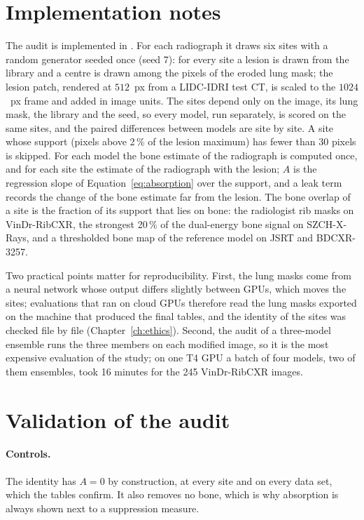 

\section{Implementation notes}
The audit is implemented in . For each radiograph it draws six sites with a random generator seeded once (seed 7):
for every site a lesion is drawn from the library and a centre is drawn among the pixels of the eroded lung mask; the lesion patch, rendered
at $512$~px from a LIDC-IDRI test CT, is scaled to the $1024$~px frame and added in image units. The sites depend only on the image, its lung
mask, the library and the seed, so every model, run separately, is scored on the same sites, and the paired differences between models are
site by site. A site whose support (pixels above 2\,\% of the lesion maximum) has fewer than 30 pixels is skipped. For each model the bone
estimate of the radiograph is computed once, and for each site the estimate of the radiograph with the lesion; $A$ is the regression slope of
Equation~\ref{eq:absorption} over the support, and a leak term records the change of the bone estimate far from the lesion. The bone overlap of
a site is the fraction of its support that lies on bone: the radiologist rib masks on VinDr-RibCXR, the strongest 20\,\% of the dual-energy
bone signal on SZCH-X-Rays, and a thresholded bone map of the reference model on JSRT and BDCXR-3257.

Two practical points matter for reproducibility. First, the lung masks come from a neural network whose output differs slightly between GPUs,
which moves the sites; evaluations that ran on cloud GPUs therefore read the lung masks exported on the machine that produced the final
tables, and the identity of the sites was checked file by file (Chapter~\ref{ch:ethics}). Second, the audit of a three-model ensemble runs
the three members on each modified image, so it is the most expensive evaluation of the study; on one T4 GPU a batch of four models, two of them
ensembles, took 16 minutes for the 245 VinDr-RibCXR images.

\section{Validation of the audit}
\paragraph{Controls.} The identity has $A=0$ by construction, at every site and on every data set, which the tables confirm. It also removes
no bone, which is why absorption is always shown next to a suppression measure.

